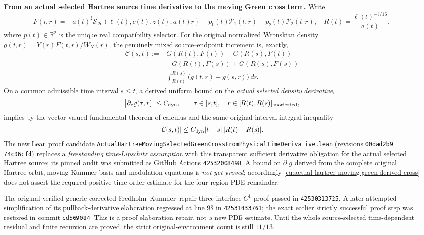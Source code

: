 \documentclass[11pt]{amsart}
\newcommand{\R}{\mathbb R}
\newcommand{\HH}{\mathcal H}
\begin{document}
\medskip
\noindent\textbf{From an actual selected Hartree source time derivative
to the moving Green cross term.}
Write
\[
 F(t,r)=-a(t)^2\mathcal S_{\HH}
    (\ell(t),c(t),z(t);a(t)r)
       -p_1(t)\mathcal P_1(t,r)-p_2(t)\mathcal P_2(t,r),
 \quad
 R(t)=\frac{\ell(t)^{-1/16}}{a(t)},
\]
where \(p(t)\in\R^2\) is the unique real compatibility selector.
For the original normalized Wronskian density
\(g(t,r)=Y(r)F(t,r)/W_K(r)\), the genuinely mixed
source--endpoint increment is, exactly,
\[
 \begin{aligned}
  \mathcal C(s,t)
  :={}&G(R(t),F(t))-G(R(s),F(t))\\
     &-G(R(t),F(s))+G(R(s),F(s))\\
   ={}&\int_{R(t)}^{R(s)}
             \bigl(g(t,r)-g(s,r)\bigr)\,dr .
 \end{aligned}
\]
On a common admissible time interval \(s\le t\), a derived uniform
bound on the \emph{actual selected density derivative},
\[
  \bigl|\partial_\tau g(\tau,r)\bigr|\le C_{\rm dyn},
 \qquad
 \tau\in[s,t],\quad
 r\in[R(t),R(s)]_{\rm unoriented},
\]
implies by the vector-valued fundamental theorem of calculus and
the same original interval integral inequality
\begin{equation}
  |\mathcal C(s,t)|
   \le C_{\rm dyn}|t-s|\,|R(t)-R(s)|.
 \label{eq:actual-hartree-moving-green-derived-cross}
\end{equation}
The new Lean proof candidate
\texttt{ActualHartreeMovingSelectedGreenCrossFromPhysicalTimeDerivative.lean}
(revisions \texttt{00dad2b9}, \texttt{74c06cfd})
replaces a \emph{freestanding time-Lipschitz assumption} with
this transparent sufficient derivative obligation for the actual
selected Hartree source; its pinned audit was submitted as
GitHub Actions \texttt{42532008498}. A bound on
\(\partial_\tau g\) derived from the complete original Hartree
orbit, moving Kummer basis and modulation equations is
\emph{not yet proved}; accordingly
\eqref{eq:actual-hartree-moving-green-derived-cross}
does not assert the required positive-time-order estimate
for the four-region PDE remainder.

The original verified generic corrected Fredholm--Kummer--repair
three-interface \(C^1\) proof passed in \texttt{42530313725}.
A later attempted simplification of its pullback-derivative
elaboration regressed at line 98 in \texttt{42531033761};
the exact earlier strictly successful proof step was restored
in commit \texttt{cd569084}. This is a proof elaboration
repair, not a new PDE estimate. Until the whole source-selected
time-dependent residual and finite recursion are proved,
the strict original-environment count is still \(11/13\).
\end{document}
